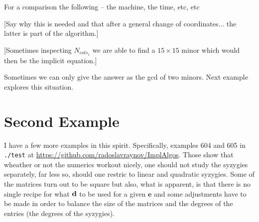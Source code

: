 \documentclass[fleqn,reqno]{amsart}
\numberwithin{first}{chapter}
\begin{document}
For a comparison the following -- the machine, the time, etc, etc

[Say why this is needed and that after a general change of coordinates...
the latter is part of the algorithm.]

[Sometimes inspecting $N_{cols_1}$ we are able to find a $15\times15$ minor
which would then be the implicit equation.]

\begin{paragraf*}
Sometimes we can only give the answer as the gcd of two minors. Next example
explores this situation.
\end{paragraf*}



\section{Second Example}
\label{sec:second-example}

\begin{paragraf*}
I have a few more examples in this spirit. Specifically, examples 604 and 605 in {\tt ./test}
at \href{https://github.com/radoslavraynov/ImplAlgos}{https://github.com/radoslavraynov/ImplAlgos}.
Those show that wheather or not the numerics workout nicely, one should not study the
syzygies separately, far less so, should one restric to linear and quadratic syzygies.
Some of the matrices turn out to be square but also, what is apparent, is that there is no
single recipe for what $\mathbf d$ to be used for a given $\mathbf e$ and some adjustments have to be made
in order to balance the size of the matrices and the degrees of the entries (the degrees of the syzygies).
\end{paragraf*}
\end{document}

